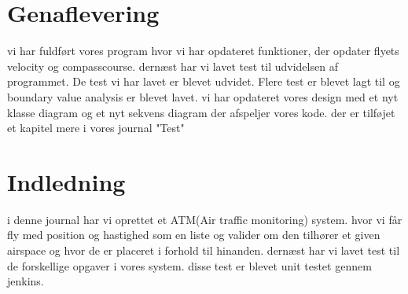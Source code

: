 \section{Genaflevering}
vi har fuldført vores program hvor vi har opdateret funktioner, der opdater flyets velocity og compasscourse. dernæst har vi lavet test til udvidelsen af programmet. De test vi har lavet er blevet udvidet. Flere test er blevet lagt til og boundary value analysis er blevet lavet. vi har opdateret vores design med et nyt klasse diagram og et nyt sekvens diagram der afspeljer vores kode. der er tilføjet et kapitel mere i vores journal "Test"
\section{Indledning}
i denne journal har vi oprettet et ATM(Air traffic monitoring) system. hvor vi får fly med position og hastighed som en liste og valider om den tilhører et given airspace og hvor de er placeret i forhold til hinanden. dernæst har vi lavet test til de forskellige opgaver i vores system. disse test er blevet unit testet gennem jenkins.


